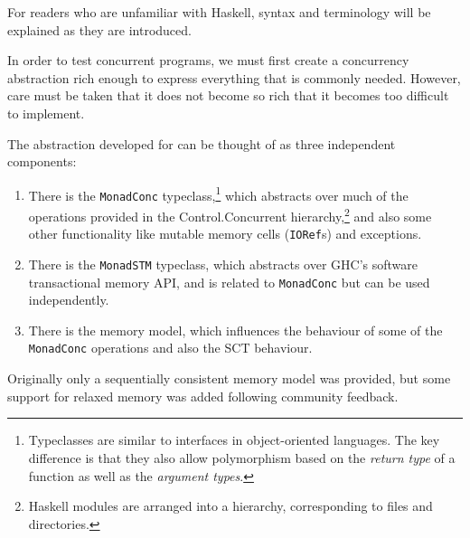 For readers who are unfamiliar with Haskell, syntax and terminology
will be explained as they are introduced.

In order to test concurrent programs, we must first create a
concurrency abstraction rich enough to express everything that is
commonly needed. However, care must be taken that it does not become
so rich that it becomes too difficult to implement.

The abstraction developed for \dejafu{} can be thought of as three
independent components:

\begin{enumerate}
\item There is the \verb|MonadConc| typeclass,\footnote{Typeclasses
    are similar to interfaces in object-oriented languages. The key
    difference is that they also allow polymorphism based on the
    \emph{return type} of a function as well as the \emph{argument
      types}.} which abstracts over much of the operations provided in
  the Control.Concurrent hierarchy,\footnote{Haskell modules are
    arranged into a hierarchy, corresponding to files and
    directories.} and also some other functionality like mutable
  memory cells (\verb|IORef|s) and exceptions.

\item There is the \verb|MonadSTM| typeclass, which abstracts over
  GHC's software transactional memory API, and is related to
  \verb|MonadConc| but can be used independently.

\item There is the memory model, which influences the behaviour of
  some of the \verb|MonadConc| operations and also the SCT behaviour.
\end{enumerate}

Originally only a sequentially consistent memory model was provided,
but some support for relaxed memory was added following community
feedback.
